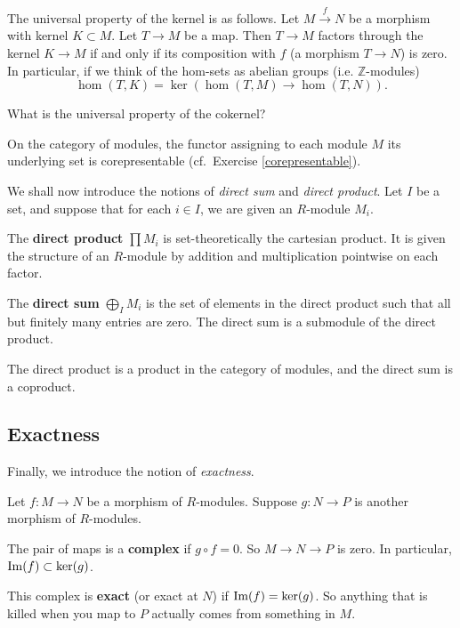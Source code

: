 \begin{exercise} \label{univpropertykernel} The universal property of the
kernel is as follows. Let $M \stackrel{f}{\to } N$ be a morphism with kernel $K
\subset M$. Let $T \to M$ be a map. Then $T \to M$ factors through the kernel
$K \to M$ if and only if its composition with $f$ (a morphism $T \to N$) is
zero. In particular, if we think of the hom-sets as abelian groups (i.e.
$\mathbb{Z}$-modules) \[ \hom( T,K) = \ker\left( \hom(T, M) \to \hom(T, N)
\right). \] \end{exercise} \begin{exercise} What is the universal property of
the cokernel? \end{exercise}

\begin{exercise} On the category of modules, the functor assigning to each
module $M$ its underlying set is corepresentable (cf.\ Exercise
\ref{corepresentable}). \end{exercise}

We shall now introduce the notions of \emph{direct sum} and \emph{direct
product}. Let $I$ be a set, and suppose that for each $i \in I$, we are given
an $R$-module $M_i$.

\begin{definition} The \textbf{direct product} $\prod M_i$ is set-theoretically
the cartesian product. It is given the structure of an $R$-module by addition
and multiplication pointwise on each factor. \end{definition}
\begin{definition} The \textbf{direct sum} $\bigoplus_I M_i$ is the set of
elements in the direct product such that all but finitely many entries are
zero. The direct sum is a submodule of the direct product. \end{definition}

\begin{exercise} The direct product is a product in the category of modules,
and the direct sum is a coproduct. \end{exercise}


\subsection{Exactness} Finally, we introduce the notion of \emph{exactness}.
\begin{definition} Let $f: M \to N$ be a morphism of $R$-modules. Suppose $g: N
\to P$ is another morphism of $R$-modules.

The pair of maps is a \textbf{complex} if $g \circ f = 0$. So $M \to N \to P$
is zero. In particular, $\mathrm{Im}(f) \subset \ker(g)$.

This complex is \textbf{exact} (or exact at $N$) if $\mathrm{Im}(f) = \ker(g)$. So
anything that is killed when you map to $P$ actually comes from something in
$M$.

\end{definition}

